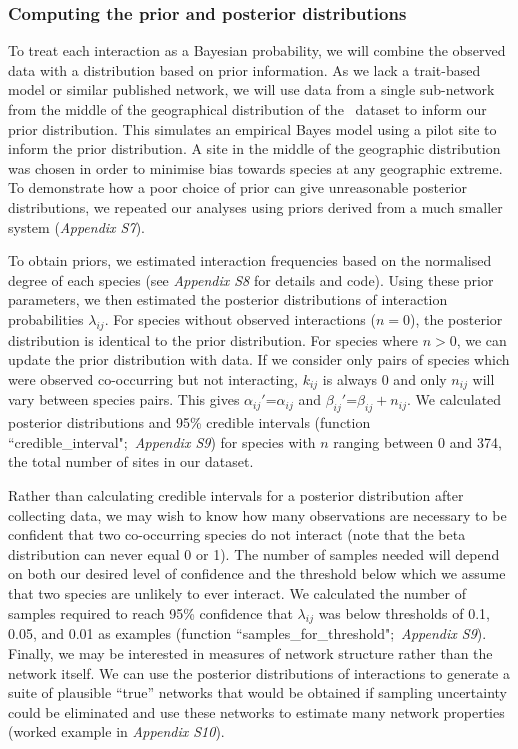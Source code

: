 \documentclass[12pt]{article}
\begin{document}
\begin{spacing}{2.0}
    \subsubsection*{Computing the prior and posterior distributions}

        To treat each interaction as a Bayesian probability, we will combine the observed data with a distribution based on prior information. As we lack a trait-based model or similar published network, we will use data from a single sub-network from the middle of the geographical distribution of the~\citet{Kopelke2017} dataset to inform our prior distribution. This simulates an empirical Bayes model using a pilot site to inform the prior distribution. A site in the middle of the geographic distribution was chosen in order to minimise bias towards species at any geographic extreme. To demonstrate how a poor choice of prior can give unreasonable posterior distributions, we repeated our analyses using priors derived from a much smaller system (\emph{Appendix S7}). 


        To obtain priors, we estimated interaction frequencies based on the normalised degree of each species (see \emph{Appendix S8} for details and code). Using these prior parameters, we then estimated the posterior distributions of interaction probabilities $\lambda_{ij}$. For species without observed interactions ($n=0$), the posterior distribution is identical to the prior distribution. For species where $n>0$, we can update the prior distribution with data. If we consider only pairs of species which were observed co-occurring but not interacting, $k_{ij}$ is always 0 and only $n_{ij}$ will vary between species pairs. This gives $\alpha_{ij}'$=$\alpha_{ij}$ and $\beta_{ij}'$=$\beta_{ij} + n_{ij}$. We calculated posterior distributions and 95\% credible intervals (function ``credible\_interval";~\emph{Appendix S9}) for species with $n$ ranging between 0 and 374, the total number of sites in our dataset. 


        Rather than calculating credible intervals for a posterior distribution after collecting data, we may wish to know how many observations are necessary to be confident that two co-occurring species do not interact (note that the beta distribution can never equal 0 or 1). The number of samples needed will depend on both our desired level of confidence and the threshold below which we assume that two species are unlikely to ever interact. We calculated the number of samples required to reach 95\% confidence that $\lambda_{ij}$ was below thresholds of 0.1, 0.05, and 0.01 as examples (function ``samples\_for\_threshold";~\emph{Appendix S9}). Finally, we may be interested in measures of network structure rather than the network itself. We can use the posterior distributions of interactions to generate a suite of plausible ``true'' networks that would be obtained if sampling uncertainty could be eliminated and use these networks to estimate many network properties (worked example in \emph{Appendix S10}).



\end{spacing}
\end{document}
